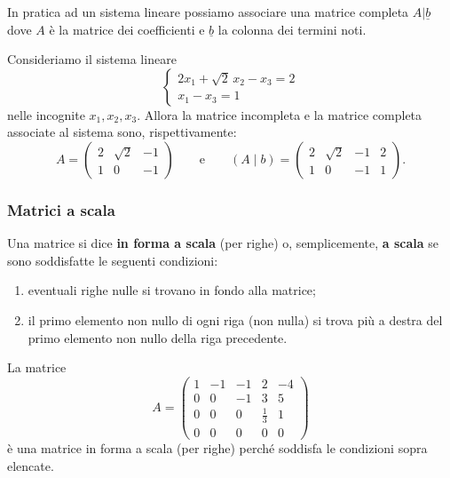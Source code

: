 \documentclass[
  a4paper,
]{article}
\providecommand{\tightlist}{%
  \setlength{\itemsep}{0pt}\setlength{\parskip}{0pt}}
\providecommand{\tightlist}{}
\begin{document}
In pratica ad un sistema lineare possiamo associare una matrice completa
\(A|\underline{b}\) dove \(A\) è la matrice dei coefficienti e
\(\underline{b}\) la colonna dei termini noti.

\begin{examplebox}
Consideriamo il sistema lineare \[
\begin{cases}
2x_1 + \sqrt{2}\,x_2 - x_3 = 2\\
x_1 - x_3 = 1
\end{cases}
\] nelle incognite \(x_1, x_2, x_3\). Allora la matrice incompleta e la
matrice completa associate al sistema sono, rispettivamente: \[
A=
\begin{pmatrix}
2 & \sqrt{2} & -1\\
1 & 0 & -1
\end{pmatrix}
\qquad\text{e}\qquad
(A\mid b)=
\left(
\begin{array}{ccc|c}
2 & \sqrt{2} & -1 & 2\\
1 & 0 & -1 & 1
\end{array}
\right).
\]
\end{examplebox}

\hypertarget{matrici-a-scala}{%
\subsubsection{Matrici a scala}\label{matrici-a-scala}}

\begin{definitionbox}
Una matrice si dice \textbf{in forma a scala} (per righe) o,
semplicemente, \textbf{a scala} se sono soddisfatte le seguenti
condizioni:

\begin{enumerate}
\def\labelenumi{\arabic{enumi}.}
\tightlist
\item
  eventuali righe nulle si trovano in fondo alla matrice;
\item
  il primo elemento non nullo di ogni riga (non nulla) si trova più a
  destra del primo elemento non nullo della riga precedente.
\end{enumerate}
\end{definitionbox}

\begin{examplebox}
La matrice \[
A=
\begin{pmatrix}
1 & -1 & -1 & 2 & -4\\
0 & 0 & -1 & 3 & 5\\
0 & 0 & 0 & \frac{1}{3} & 1\\
0 & 0 & 0 & 0 & 0
\end{pmatrix}
\] è una matrice in forma a scala (per righe) perché soddisfa le
condizioni sopra elencate.
\end{examplebox}
\end{document}
